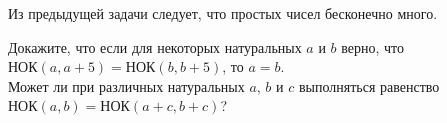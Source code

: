 Из предыдущей задачи следует, что простых чисел бесконечно много.

\begin{problems}

\item
\subproblem
Докажите, что если для некоторых натуральных $a$ и $b$ верно, что
$\text{НОК}(a, a + 5) = \text{НОК}(b, b + 5)$, то $a = b$.
\\
\subproblem
Может ли при различных натуральных $a$, $b$ и $c$ выполняться равенство
$\text{НОК}(a, b) = \text{НОК}(a + c, b + c)$?

\end{problems}

